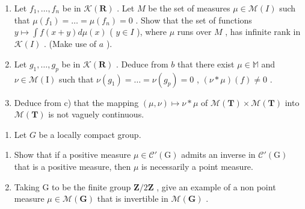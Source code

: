 \begin{enumerate}
\def\labelenumi{\alph{enumi})}
\setcounter{enumi}{1}
\item
  Let \(f_1, \ldots, f_n\) be in \(\mathcal{K}(\mathbf{R})\) . Let \(M\) be the set of measures \(\mu \in \mathcal{M}(I)\) such that \(\mu(f_1) = \ldots = \mu(f_n) = 0\) . Show that the set of functions \(y \mapsto \int f(x + y) d\mu(x)\) ( \(y \in I\) ), where \(\mu\) runs over \(M\) , has infinite rank in \(\mathcal{K}(I)\) . (Make use of \(a\) ).
\item
  Let \(g_1, \ldots, g_p\) be in \(\mathcal{K}(\mathbf{R})\) . Deduce from \(b\) that there exist \(\mu \in \mathbb{M}\) and \(\nu \in \mathcal{M}(\mathrm{I})\) such that \(\nu(g_1) = \ldots = \nu(g_p) = 0\) , \((\nu * \mu)(f) \neq 0\) .
\item
  Deduce from c) that the mapping \((\mu,\nu)\mapsto\nu*\mu\) of \(\mathcal{M}(\mathbf{T})\times\mathcal{M}(\mathbf{T})\) into \(\mathcal{M}(\mathbf{T})\) is not vaguely continuous.
\end{enumerate}

\begin{enumerate}
\def\labelenumi{\arabic{enumi})}
\setcounter{enumi}{6}
\tightlist
\item
  Let \(G\) be a locally compact group.
\end{enumerate}

\begin{enumerate}
\def\labelenumi{\alph{enumi})}
\item
  Show that if a positive measure \(\mu \in \mathcal{C}'(\mathrm{G})\) admits an inverse in \(\mathcal{C}'(\mathrm{G})\) that is a positive measure, then \(\mu\) is necessarily a point measure.
\item
  Taking G to be the finite group \(\mathbf{Z}/2\mathbf{Z}\) , give an example of a non point measure \(\mu \in \mathcal{M}(\mathbf{G})\) that is invertible in \(\mathcal{M}(\mathbf{G})\) .
\end{enumerate}

